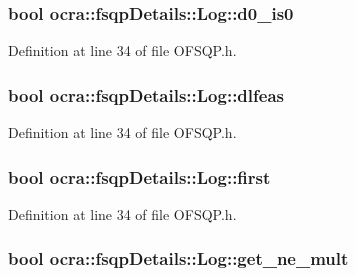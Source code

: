 \subsubsection[{\texorpdfstring{d0\+\_\+is0}{d0_is0}}]{\setlength{\rightskip}{0pt plus 5cm}bool ocra\+::fsqp\+Details\+::\+Log\+::d0\+\_\+is0}\hypertarget{structocra_1_1fsqpDetails_1_1Log_a66091f6ab3b26727a8bb20be11997af7}{}\label{structocra_1_1fsqpDetails_1_1Log_a66091f6ab3b26727a8bb20be11997af7}


Definition at line 34 of file O\+F\+S\+Q\+P.\+h.

\subsubsection[{\texorpdfstring{dlfeas}{dlfeas}}]{\setlength{\rightskip}{0pt plus 5cm}bool ocra\+::fsqp\+Details\+::\+Log\+::dlfeas}\hypertarget{structocra_1_1fsqpDetails_1_1Log_ab99dfa8d9e4586ab424df50710ae3961}{}\label{structocra_1_1fsqpDetails_1_1Log_ab99dfa8d9e4586ab424df50710ae3961}


Definition at line 34 of file O\+F\+S\+Q\+P.\+h.

\subsubsection[{\texorpdfstring{first}{first}}]{\setlength{\rightskip}{0pt plus 5cm}bool ocra\+::fsqp\+Details\+::\+Log\+::first}\hypertarget{structocra_1_1fsqpDetails_1_1Log_add5ea7abffed65d8e168c8f47317c9bc}{}\label{structocra_1_1fsqpDetails_1_1Log_add5ea7abffed65d8e168c8f47317c9bc}


Definition at line 34 of file O\+F\+S\+Q\+P.\+h.

\subsubsection[{\texorpdfstring{get\+\_\+ne\+\_\+mult}{get_ne_mult}}]{\setlength{\rightskip}{0pt plus 5cm}bool ocra\+::fsqp\+Details\+::\+Log\+::get\+\_\+ne\+\_\+mult}\hypertarget{structocra_1_1fsqpDetails_1_1Log_aadc61b25f57b2277b7431ecedc29c6b4}{}\label{structocra_1_1fsqpDetails_1_1Log_aadc61b25f57b2277b7431ecedc29c6b4}


